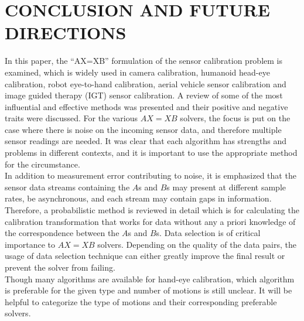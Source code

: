\documentclass[twocolumn,10pt]{asme2ej}
\begin{document}
\section{CONCLUSION AND FUTURE DIRECTIONS}
In this paper, the ``AX=XB'' formulation of the sensor calibration problem is examined, which is widely used in camera calibration, humanoid head-eye calibration, robot eye-to-hand calibration, aerial vehicle sensor calibration and image guided therapy (IGT) sensor calibration. A review of some of the most influential and effective methods was presented and their positive and negative traits were discussed. For the various $AX=XB$ solvers, the focus is put on the case where there is noise on the incoming sensor data, and therefore multiple sensor readings are needed. It was clear that each algorithm has strengths and problems in different contexts, and it is important to use the appropriate method for the circumstance.\\
In addition to measurement error contributing to noise, it is emphasized that the sensor data streams containing the $A$s and $B$s may present at different sample rates, be asynchronous, and each stream may contain gaps in information. Therefore, a probabilistic method is reviewed in detail which is for calculating the calibration transformation that works for data without any a priori knowledge of the correspondence between the $A$s and $B$s. Data selection is of critical importance to $AX=XB$ solvers. Depending on the quality of the data pairs, the usage of data selection technique can either greatly improve the final result or prevent the solver from failing. \\
Though many algorithms are available for hand-eye calibration, which algorithm is preferable for the given type and number of motions is still unclear. It will be helpful to categorize the type of motions and their corresponding preferable solvers.  

\end{document}
